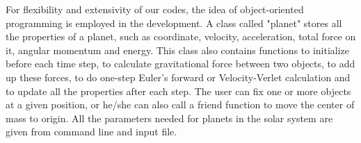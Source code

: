 For flexibility and extensivity of our codes, the idea of object-oriented programming is employed in the development. 
A class called "planet" stores all the properties of a planet, such as coordinate, velocity, acceleration, total force on it, 
angular momentum and energy. 
This class also contains functions to initialize before each time step, to calculate gravitational force between two objects, 
to add up these forces, to do one-step Euler's forward or Velocity-Verlet calculation and to update all the properties after each step. 
The user can fix one or more objects at a given position, 
or he/she can also call a friend function to move the center of mass to origin. 
All the parameters needed for planets in the solar system are given from command line and input file. 